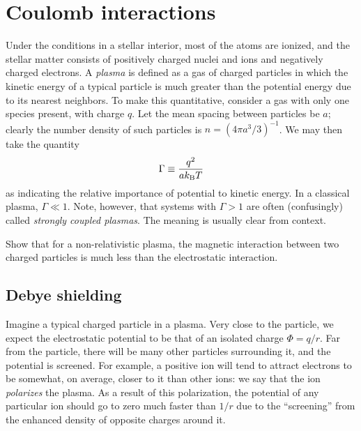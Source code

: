 \section{Coulomb interactions}
Under the conditions in a stellar interior, most of the atoms are ionized, and the stellar matter consists of positively charged nuclei and ions and negatively charged electrons. A \emph{plasma} is defined as a gas of charged particles in which the kinetic energy of a typical particle is much greater than the potential energy due to its nearest neighbors. To make this quantitative, consider a gas with only one species present, with charge $q$.  Let the mean spacing between particles be $a$; clearly the number density of such particles is $n = (4\pi a^{3}/3)^{-1}$.  We may then take the quantity
\begin{equation}\label{e.Gamma-definition}
\Gamma \equiv \frac{q^{2}}{ak_\mathrm{B} T}
\end{equation}
as indicating the relative importance of potential to kinetic energy.  In a classical plasma, $\Gamma \ll 1$.  Note, however, that systems with $\Gamma > 1$ are often (confusingly) called  \emph{strongly coupled plasmas}. The meaning is usually clear from context.


\begin{exercisebox}
Show that for a non-relativistic plasma, the magnetic interaction between two charged particles is much less than the electrostatic interaction.
\end{exercisebox}

\subsection{Debye shielding}\label{s.plasma-shielding}

Imagine a typical charged particle in a plasma.  Very close to the particle, we expect the electrostatic potential to be that of an isolated charge $\Phi = q/r$. Far from the particle, there will be many other particles surrounding it, and the potential is screened. For example, a positive ion will tend to attract electrons to be somewhat, on average, closer to it than other ions: we say that the ion \emph{polarizes} the plasma.  As a result of this polarization, the potential of any particular ion should go to zero much faster than $1/r$ due to the ``screening'' from the enhanced density of opposite charges around it.

